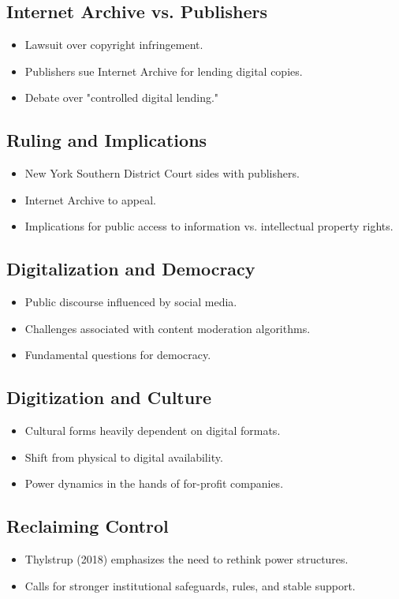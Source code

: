 \documentclass{article}
\begin{document}
\subsection*{Internet Archive vs. Publishers}
\begin{itemize}
  \item Lawsuit over copyright infringement.
  \item Publishers sue Internet Archive for lending digital copies.
  \item Debate over "controlled digital lending."
\end{itemize}

\subsection*{Ruling and Implications}
\begin{itemize}
  \item New York Southern District Court sides with publishers.
  \item Internet Archive to appeal.
  \item Implications for public access to information vs. intellectual property rights.
\end{itemize}

\subsection*{Digitalization and Democracy}
\begin{itemize}
  \item Public discourse influenced by social media.
  \item Challenges associated with content moderation algorithms.
  \item Fundamental questions for democracy.
\end{itemize}

\subsection*{Digitization and Culture}
\begin{itemize}
  \item Cultural forms heavily dependent on digital formats.
  \item Shift from physical to digital availability.
  \item Power dynamics in the hands of for-profit companies.
\end{itemize}

\subsection*{Reclaiming Control}
\begin{itemize}
  \item Thylstrup (2018) emphasizes the need to rethink power structures.
  \item Calls for stronger institutional safeguards, rules, and stable support.
\end{itemize}
\end{document}
